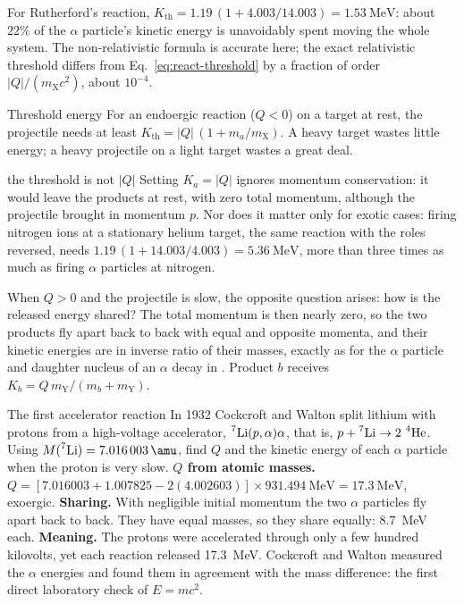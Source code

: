 For Rutherford's reaction,
$K_{\text{th}}=1.19\,(1+\num{4.003}/\num{14.003})=\SI{1.53}{\MeV}$: about $22\%$ of the $\alpha$
particle's kinetic energy is unavoidably spent moving the whole system. The non-relativistic formula is
accurate here; the exact relativistic threshold differs from Eq.~\eqref{eq:react-threshold} by a fraction
of order $|Q|/(m_{\mathrm X}c^2)$, about $10^{-4}$.

\begin{keybox}{Threshold energy}
For an endoergic reaction ($Q<0$) on a target at rest, the projectile needs at least
$K_{\text{th}}=|Q|\,(1+m_a/m_{\mathrm X})$. A heavy target wastes little energy; a heavy projectile on a
light target wastes a great deal.
\end{keybox}

\begin{trapbox}{the threshold is not $|Q|$}
Setting $K_a=|Q|$ ignores momentum conservation: it would leave the products at rest, with zero total
momentum, although the projectile brought in momentum $p$. Nor does it matter only for exotic cases:
firing nitrogen ions at a stationary helium target, the same reaction with the roles reversed, needs
$1.19\,(1+14.003/4.003)=\SI{5.36}{\MeV}$, more than three times as much as firing $\alpha$ particles at
nitrogen.
\end{trapbox}

When $Q>0$ and the projectile is slow, the opposite question arises: how is the released energy shared?
The total momentum is then nearly zero, so the two products fly apart back to back with equal and opposite
momenta, and their kinetic energies are in inverse ratio of their masses, exactly as for the $\alpha$
particle and daughter nucleus of an $\alpha$ decay in . Product $b$ receives
$K_b=Q\,m_{\mathrm Y}/(m_b+m_{\mathrm Y})$.

\begin{exbox}{The first accelerator reaction}\label{ex:react-cockcroft}
In 1932 Cockcroft and Walton split lithium with protons from a high-voltage accelerator,
$\prescript{7}{}{\mathrm{Li}}(p,\alpha)\alpha$, that is, $p+\prescript{7}{}{\mathrm{Li}}\to2\,\prescript{4}{}{\mathrm{He}}$. Using
$M(\iso{7}{Li})=\SI{7.016003}{\amu}$, find $Q$ and the kinetic energy of each $\alpha$ particle when the
proton is very slow.
 \textbf{$Q$ from atomic masses.}
$Q=[\num{7.016003}+\num{1.007825}-2(\num{4.002603})]\times\SI{931.494}{\MeV}=\SI{17.3}{\MeV}$, exoergic.
 \textbf{Sharing.} With negligible initial momentum the two $\alpha$ particles fly apart back to
back. They have equal masses, so they share equally: \SI{8.7}{\MeV} each.
 \textbf{Meaning.} The protons were accelerated through only a few hundred kilovolts, yet each
reaction released \SI{17.3}{\MeV}. Cockcroft and Walton measured the $\alpha$ energies and found them in
agreement with the mass difference: the first direct laboratory check of $E=mc^2$.
\end{exbox}

